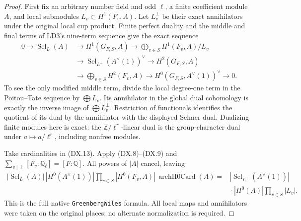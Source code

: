 \begin{proof}
First fix an arbitrary number field and odd $\ell$, a finite
coefficient module $A$, and local submodules
$L_v\subset H^1(F_v,A)$.  Let $L_v^\perp$ be their exact
annihilators under the original local cup product.
Finite perfect duality and the middle and final terms of
LD3's nine-term sequence give the exact sequence
\[
\begin{aligned}
0\to\operatorname{Sel}_{L}(A)&\to H^1(G_{F,S},A)
 \to\bigoplus_{v\in S}H^1(F_v,A)/L_v\\
 &\to\operatorname{Sel}_{L^\perp}(A^\vee(1))^\vee
 \to H^2(G_{F,S},A)\\
 &\to\bigoplus_{v\in S}H^2(F_v,A)
 \to H^0(G_{F,S},A^\vee(1))^\vee\to0 .
\end{aligned}
 \tag{DX.13}
\]
To see the only modified middle term, divide the local
degree-one term in the Poitou--Tate sequence by $\bigoplus L_v$.
Its annihilator in the global dual cohomology is exactly the
inverse image of $\bigoplus L_v^\perp$.  Restriction of
functionals identifies the quotient of its dual by the
annihilator with the displayed Selmer dual.
Dualizing finite modules here is exact: the
$\mathbb Z/\ell^r$-linear dual is the group-character dual
under $a\mapsto a/\ell^r$, including nonfree modules.

Take cardinalities in (DX.13).  Apply (DX.8)--(DX.9) and
$\sum_{v\mid\ell}[F_v:\mathbb Q_\ell]=[F:\mathbb Q]$.
All powers of $|A|$ cancel, leaving
\[
\begin{aligned}
|\operatorname{Sel}_L(A)|\,|H^0(A^\vee(1))|
 \prod_{v\in S}|H^0(F_v,A)|\,\operatorname{archH0Card}(A)
={}&|\operatorname{Sel}_{L^\perp}(A^\vee(1))|\\
&{}\cdot |H^0(A)|\prod_{v\in S}|L_v|.
\end{aligned}
 \tag{DX.14}
\]
This is the full native \texttt{GreenbergWiles} formula.
All local maps and annihilators were taken on the original
places; no alternate normalization is required.


\end{proof}
